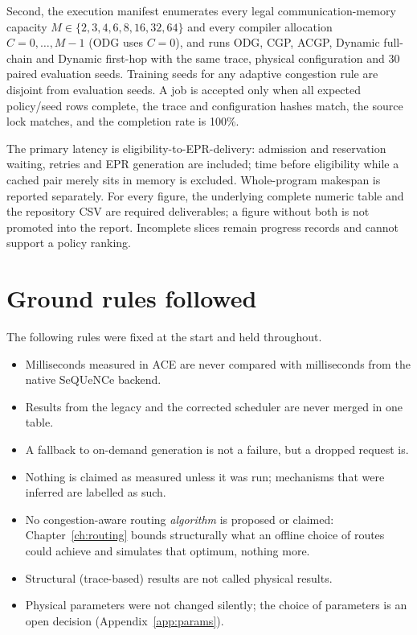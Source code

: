 Second, the execution manifest enumerates every legal communication-memory
capacity $M\in\{2,3,4,6,8,16,32,64\}$ and every compiler allocation
$C=0,\ldots,M-1$ (ODG uses $C=0$), and runs ODG, CGP, ACGP, Dynamic full-chain
and Dynamic first-hop with the same trace, physical configuration and 30 paired
evaluation seeds. Training seeds for any adaptive congestion rule are disjoint
from evaluation seeds. A job is accepted only when all expected policy/seed rows
complete, the trace and configuration hashes match, the source lock matches,
and the completion rate is 100\%.

The primary latency is eligibility-to-EPR-delivery: admission and reservation
waiting, retries and EPR generation are included; time before eligibility while
a cached pair merely sits in memory is excluded. Whole-program makespan is
reported separately. For every figure, the underlying complete numeric table and
the repository CSV are required deliverables; a figure without both is not
promoted into the report. Incomplete slices remain progress records and cannot
support a policy ranking.

\section{Ground rules followed}
The following rules were fixed at the start and held throughout.
\begin{itemize}
  \item Milliseconds measured in ACE are never compared with milliseconds from the native SeQUeNCe backend.
  \item Results from the legacy and the corrected scheduler are never merged in one table.
  \item A fallback to on-demand generation is not a failure, but a dropped request is.
  \item Nothing is claimed as measured unless it was run; mechanisms that were inferred are labelled as such.
  \item No congestion-aware routing \emph{algorithm} is proposed or claimed: Chapter~\ref{ch:routing} bounds structurally what an offline choice of routes could achieve and simulates that optimum, nothing more.
  \item Structural (trace-based) results are not called physical results.
  \item Physical parameters were not changed silently; the choice of parameters is an open decision
        (Appendix~\ref{app:params}).
\end{itemize}

